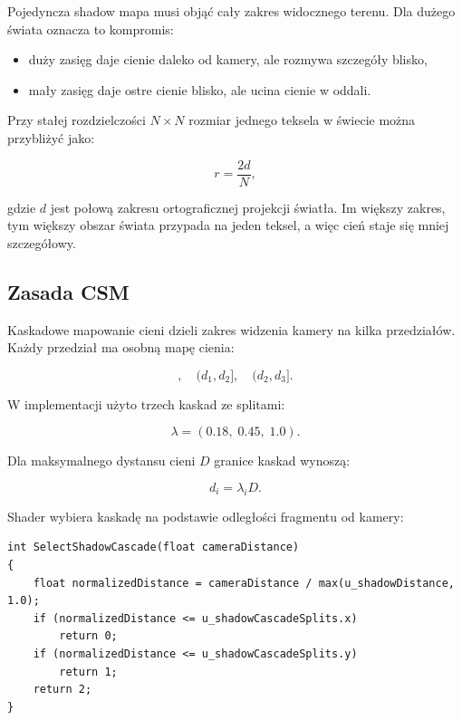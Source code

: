\documentclass[12pt,a4paper]{article}
\begin{document}
Pojedyncza shadow mapa musi objąć cały zakres widocznego terenu. Dla dużego świata oznacza to kompromis:

\begin{itemize}
    \item duży zasięg daje cienie daleko od kamery, ale rozmywa szczegóły blisko,
    \item mały zasięg daje ostre cienie blisko, ale ucina cienie w oddali.
\end{itemize}

Przy stałej rozdzielczości $N \times N$ rozmiar jednego teksela w świecie można przybliżyć jako:

\begin{equation}
    r = \frac{2d}{N},
\end{equation}

gdzie $d$ jest połową zakresu ortograficznej projekcji światła. Im większy zakres, tym większy obszar świata przypada na jeden teksel, a więc cień staje się mniej szczegółowy.

\subsection{Zasada CSM}

Kaskadowe mapowanie cieni dzieli zakres widzenia kamery na kilka przedziałów. Każdy przedział ma osobną mapę cienia:

\begin{equation}
    [0, d_1], \quad (d_1, d_2], \quad (d_2, d_3].
\end{equation}

W implementacji użyto trzech kaskad ze splitami:

\begin{equation}
    \lambda = (0.18,\;0.45,\;1.0).
\end{equation}

Dla maksymalnego dystansu cieni $D$ granice kaskad wynoszą:

\begin{equation}
    d_i = \lambda_i D.
\end{equation}

Shader wybiera kaskadę na podstawie odległości fragmentu od kamery:

\begin{lstlisting}[style=glslstyle,caption={Wybór kaskady w shaderze terenu.}]
int SelectShadowCascade(float cameraDistance)
{
    float normalizedDistance = cameraDistance / max(u_shadowDistance, 1.0);
    if (normalizedDistance <= u_shadowCascadeSplits.x)
        return 0;
    if (normalizedDistance <= u_shadowCascadeSplits.y)
        return 1;
    return 2;
}
\end{lstlisting}
\end{document}
